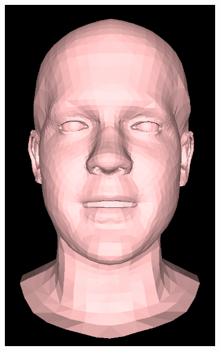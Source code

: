 \begin{figure}[h]
    \centering
    \begin{subfigure}[b]{0.24\textwidth}
        \includegraphics[width=\textwidth]{figures/blendshape_interp/1/00001.png}
    \end{subfigure}
    \begin{subfigure}[b]{0.24\textwidth}

\end{subfigure}
\end{figure}

